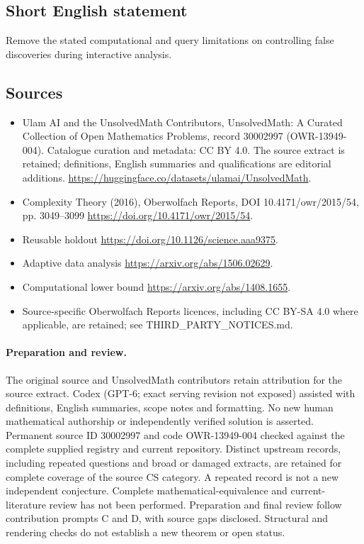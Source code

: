 \documentclass[11pt]{article}
\begin{document}
\subsection{Short English statement}
Remove the stated computational and query limitations on controlling false discoveries during interactive analysis.
\subsection{Sources}
\begin{itemize}
\item[\hypertarget{source:30002997:1}{S1}] Ulam AI and the UnsolvedMath Contributors, UnsolvedMath: A Curated Collection of Open Mathematics Problems, record 30002997 (OWR-13949-004). Catalogue curation and metadata: CC BY 4.0. The source extract is retained; definitions, English summaries and qualifications are editorial additions.
\url{https://huggingface.co/datasets/ulamai/UnsolvedMath}.
\item[\hypertarget{source:30002997:2}{S2}] Complexity Theory (2016), Oberwolfach Reports, DOI 10.4171/owr/2015/54, pp. 3049--3099
\url{https://doi.org/10.4171/owr/2015/54}.
\item[\hypertarget{source:30002997:3}{S3}] Reusable holdout
\url{https://doi.org/10.1126/science.aaa9375}.
\item[\hypertarget{source:30002997:4}{S4}] Adaptive data analysis
\url{https://arxiv.org/abs/1506.02629}.
\item[\hypertarget{source:30002997:5}{S5}] Computational lower bound
\url{https://arxiv.org/abs/1408.1655}.
\item Source-specific Oberwolfach Reports licences, including CC BY-SA 4.0 where applicable, are retained; see THIRD\_PARTY\_NOTICES.md.
\end{itemize}
\paragraph{Preparation and review.}
The original source and UnsolvedMath contributors retain attribution for the source extract. Codex (GPT-6; exact serving revision not exposed) assisted with definitions, English summaries, scope notes and formatting. No new human mathematical authorship or independently verified solution is asserted. Permanent source ID 30002997 and code OWR-13949-004 checked against the complete supplied registry and current repository. Distinct upstream records, including repeated questions and broad or damaged extracts, are retained for complete coverage of the source CS category. A repeated record is not a new independent conjecture. Complete mathematical-equivalence and current-literature review has not been performed. Preparation and final review follow contribution prompts C and D, with source gaps disclosed. Structural and rendering checks do not establish a new theorem or open status.
\label{end:30002997}
\end{document}
